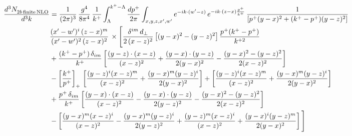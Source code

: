 \documentclass[9pt]{article}
\numberwithin{equation}{section}
\begin{document}
\begin{align}
    \frac{d^{3}N_{2b\,\rm finite\, NLO}^{\rm}}{d^{3}k} & = \frac{1}{(2\pi)^{3}}\,\frac{g^{4}}{8\pi^{4}}\,\frac{1}{k^{+}}\int_{\Lambda}^{k^{+}-\Lambda}\frac{dp^{+}}{2\pi}\int_{x,y,z,x',w'}e^{-ik\cdot(w'-z)}\,e^{-ik\cdot(z-x)\frac{p^{+}}{k^{+}}}\,\frac{1}{\left[p^{+}(y-x)^{2}+(k^{+}-p^{+})(y-z)^{2}\right]}\notag \\ & \frac{(x'-w')^{i}\,(z-x)^{m}}{(x'-w')^{2}\,(z-x)^{2}}\,\times\Bigg[\frac{\delta^{im}\,d_{\perp}}{2\,(x-z)^{2}}\left[(y-x)^{2}-(y-z)^{2}\right]\frac{p^{+}(k^{+}-p^{+})}{k^{+2}}
\notag \\ & +\frac{(k^{+}-p^{+})\,\delta_{im}}{k^{+}}\left[\frac{(y-z)\cdot(x-z)}{(x-z)^{2}}+\frac{(y-x)\cdot(y-z)}{2(y-x)^{2}}-\frac{(y-x)^{2}-(y-z)^{2}}{2(x-z)^{2}}\right]\notag\\
&-\left[\frac{k^{+}}{p^{+}}\right]_{+}\,\left[\frac{(y-z)^{i}(x-z)^{m}}{(x-z)^{2}}+\frac{(y-x)^{m}(y-z)^{i}}{2(y-x)^{2}}\right]+\left[\frac{(y-z)^{i}(x-z)^{m}}{(x-z)^{2}}+\frac{(y-x)^{m}(y-z)^{i}}{2(y-x)^{2}}\right]\notag\\
&+\frac{p^{+}\,\delta_{im}}{k^{+}}\left[\frac{(y-x)\cdot(x-z)}{(x-z)^{2}}-\frac{(y-x)\cdot(y-z)}{2(y-z)^{2}}-\frac{(y-x)^{2}-(y-z)^{2}}{2(x-z)^{2}}\right]\notag\\
&-\left[\frac{(y-x)^{m}(x-z)^{i}}{(x-z)^{2}}-\frac{(y-x)^{m}(y-z)^{i}}{2(y-z)^{2}}+\frac{(y-z)^{m}(x-z)^{i}}{(x-z)^{2}}+\frac{(y-x)^{i}(y-z)^{m}}{2(y-x)^{2}}\right]\Bigg]\notag\\

\end{align}
\end{document}
